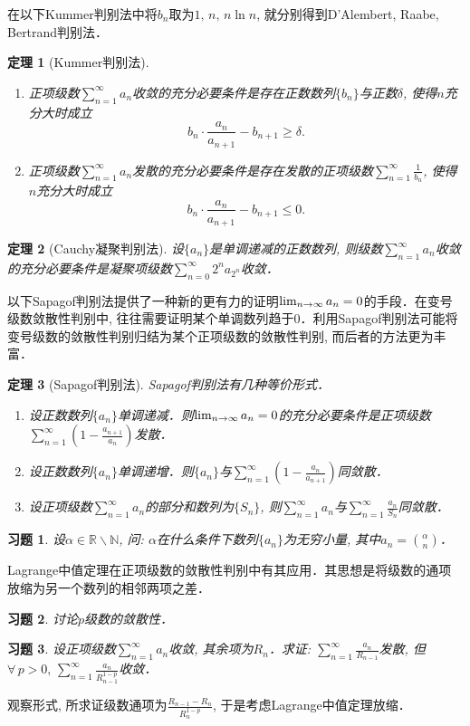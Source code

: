 \documentclass[11pt,a4paper]{ctexart}
\makeatletter
\theoremstyle{thmseries} %
\newtheorem{thm}{定理}[section]
\theoremstyle{exerseries}
\newtheorem{exer}{习题}[section]
\renewenvironment{proof}[1][\proofname]{\par
  \pushQED{\qed}%
  \normalfont \topsep6\p@\@plus6\p@\relax
  \trivlist
  \item[\hskip\labelsep
        \itshape
    #1\@addpunct{}]\ignorespaces
}{%
  \popQED\endtrivlist\@endpefalse
}
\newenvironment{pf}{\begin{proof}[\bfseries\upshape 证\quad]}{\end{proof}}
\newcommand{\bra}[1]{\mathopen{}\left(#1\right)}
\newcommand{\R}{\mathbb{R}}
\newcommand{\N}{\mathbb{N}}
\def \nti {\mathnormal{n}\to\infty}
\def \series {\sum_{n=1}^{\infty}}
\makeatother
\begin{document}
在以下Kummer判别法中将$b_n$取为$1,\,n,\,n\ln n$, 就分别得到D'Alembert, Raabe, Bertrand判别法．
\begin{thm}[Kummer判别法]
	\phantom{text}

	\begin{enumerate}
		\item 正项级数$\series a_n$收敛的充分必要条件是存在正数数列$\{b_n\}$与正数$\delta$, 使得$n$充分大时成立
		\[b_n\cdot\frac{a_n}{a_{n+1}}-b_{n+1}\geq\delta.\]
		\item 正项级数$\series a_n$发散的充分必要条件是存在发散的正项级数$\series \frac{1}{b_n}$, 使得$n$充分大时成立
		\[b_n\cdot\frac{a_n}{a_{n+1}}-b_{n+1}\leq0.\]
	\end{enumerate}
\end{thm}

\begin{thm}[Cauchy凝聚判别法]
	设$\{a_n\}$是单调递减的正数数列, 则级数$\series a_n$收敛的充分必要条件是凝聚项级数$\sum_{n=0}^{\infty}2^na_{2^n}$收敛．
\end{thm}

以下Sapagof判别法提供了一种新的更有力的证明$\lim_{\nti}a_n=0$的手段．在变号级数敛散性判别中, 往往需要证明某个单调数列趋于$0$．利用Sapagof判别法可能将变号级数的敛散性判别归结为某个正项级数的敛散性判别, 而后者的方法更为丰富．
\begin{thm}[Sapagof判别法]
	Sapagof判别法有几种等价形式．
	\begin{enumerate}
		\item 设正数数列$\{a_n\}$单调递减．则$\lim_{\nti}a_n=0$的充分必要条件是正项级数$\series\bra{1-\frac{a_{n+1}}{a_n}}$发散．
		\item 设正数数列$\{a_n\}$单调递增．则$\{a_n\}$与$\series\bra{1-\frac{a_n}{a_{n+1}}}$同敛散．
		\item 设正项级数$\series a_n$的部分和数列为$\{S_n\}$, 则$\series a_n$与$\series\frac{a_n}{S_n}$同敛散．
	\end{enumerate}
\end{thm}

\begin{exer}
	设$\alpha\in\R\backslash\N$, 问: $\alpha$在什么条件下数列$\{a_n\}$为无穷小量, 其中$a_n=\binom{\alpha}{n}$．
\end{exer}

Lagrange中值定理在正项级数的敛散性判别中有其应用．其思想是将级数的通项放缩为另一个数列的相邻两项之差．
\begin{exer}
	讨论$p$级数的敛散性．
\end{exer}
\begin{exer}
	设正项级数$\series a_n$收敛, 其余项为$R_n$．求证: $\series\frac{a_n}{R_{n-1}}$发散, 但$\forall\,p>0,\,\series\frac{a_n}{R_{n-1}^{1-p}}$收敛．
\end{exer}
\begin{pf}
	观察形式, 所求证级数通项为$\frac{R_{n-1}-R_n}{R_n^{1-p}}$, 于是考虑Lagrange中值定理放缩．
\end{pf}
\end{document}
